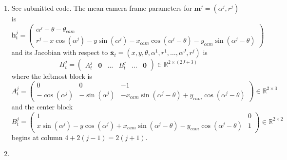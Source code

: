 \documentclass[12pt]{article}
\begin{document}
\begin{enumerate}
\begin{align*}
\begin{array}{cccccccc}
		0 & 0 & 1 & 0 & 0 & \ldots & 0 & 0 \\
		0 & 0 & 0 & 1 & 0 & \ldots & 0 & 0 \\
		0 & 0 & 0 & 0 & 1 & \ldots & 0 & 0 \\
		\vdots & \vdots & \vdots & \vdots & \vdots & \ddots & \vdots & \vdots \\
		0 & 0 & 0 & 0 & 0 & \ldots & 1 & 0 \\
		0 & 0 & 0 & 0 & 0 & \ldots & 0 & 1
		\end{array}\right) \\
		G_u = \frac{1}{\omega_t}&\left(\begin{array}{cc}
		\sin(\theta_t) - \sin(\theta_{t-1}) & -\frac{V_t}{\omega_t}(\sin(\theta_t) - \sin(\theta_{t-1})) + V_t\cos(\theta_t)dt \\
		-\cos(\theta_t) + \cos(\theta_{t-1}) & \frac{V_t}{\omega_t}(\cos(\theta_t) - \cos(\theta_{t-1})) + V_t\sin(\theta_t)dt \\
		0 & \omega_tdt \\
		0 & dt \\
		0 & 0 \\
		0 & 0 \\
		\vdots & \vdots \\
		0 & 0 \\
		0 & 0
		\end{array}\right).
	\end{align*}
	where $\theta_t := \theta_{t-1} + \omega_tdt$.
	\item See submitted code. The mean camera frame parameters for $\mathbf{m}^j = (\alpha^j, r^j)$ is
	\[
		\mathbf{h}_t^j = \left(\begin{array}{c}
		\alpha^j - \theta - \theta_{cam} \\
		r^j - x\cos(\alpha^j) - y\sin(\alpha^j) - x_{cam}\cos(\alpha^j - \theta) - y_{cam}\sin(\alpha^j - \theta)
		\end{array}\right)
	\]
	and its Jacobian with respect to $\bar{\mathbf{x}}_t = (x,y,\theta,\alpha^1,r^1,\ldots, \alpha^J,r^j)$ is
	\[
		H_t^j = \left(\begin{array}{cccccc}
		A_t^j & \mathbf{0} & \ldots & B_t^j & \ldots & \mathbf{0}
		\end{array}\right) \in \mathbb{R}^{2 \times (2J + 3)}
	\]
	where the leftmost block is
	\[
		A_t^j = \left(\begin{array}{ccc}
			0 & 0 & -1 \\
			-\cos(\alpha^j) & -\sin(\alpha^j) & -x_{cam}\sin(\alpha^j - \theta) + y_{cam}\cos(\alpha^j - \theta)
		\end{array}\right) \in \mathbb{R}^{2 \times 3}
	\]
	and the center block
	\[
		B_t^j = \left(\begin{array}{cc}
			1 & 0 \\
			x\sin(\alpha^j) - y\cos(\alpha^j) + x_{cam}\sin(\alpha^j - \theta) -y_{cam}\cos(\alpha^j - \theta) & 1
		\end{array}\right) \in \mathbb{R}^{2 \times 2}
	\]
	begins at column $4 + 2(j-1) = 2(j+1)$.
	\item 
\end{enumerate}
\end{document}
